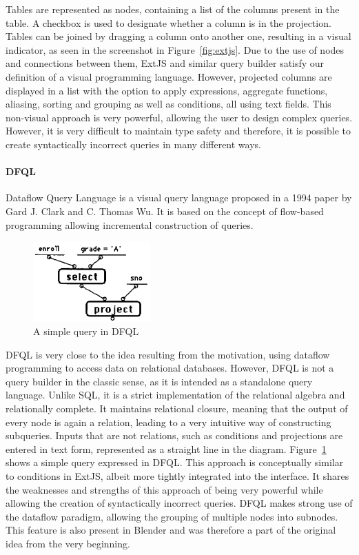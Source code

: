 \documentclass[11pt,a4paper]{globis-book}
\begin{document}
Tables are represented as nodes, containing a list of the columns present in the table. A checkbox is used to designate whether a column is in the projection. Tables can be joined by dragging a column onto another one, resulting in a visual indicator, as seen in the screenshot in Figure~\ref{fig:extjs}. Due to the use of nodes and connections between them, ExtJS and similar query builder satisfy our definition of a visual programming language. However, projected columns are displayed in a list with the option to apply expressions, aggregate functions, aliasing, sorting and grouping as well as conditions, all using text fields. This non-visual approach is very powerful, allowing the user to design complex queries. However, it is very difficult to maintain type safety and therefore, it is possible to create syntactically incorrect queries in many different ways.

\paragraph*{DFQL}
Dataflow Query Language is a visual query language proposed in a 1994 paper by Gard J. Clark and C. Thomas Wu\cite{clark1994dfql}. It is based on the concept of flow-based programming allowing incremental construction of queries.

\begin{figure}[h]
  \centering
  \includegraphics[width=0.4\textwidth]{resources/DFQL.png}
  \caption{A simple query in DFQL}
  \label{fig:dfql}
\end{figure}

DFQL is very close to the idea resulting from the motivation, using dataflow programming to access data on relational databases. However, DFQL is not a query builder in the classic sense, as it is intended as a standalone query language. Unlike SQL, it is a strict implementation of the relational algebra and relationally complete. It maintains relational closure, meaning that the output of every node is again a relation, leading to a very intuitive way of constructing subqueries. Inputs that are not relations, such as conditions and projections are entered in text form, represented as a straight line in the diagram. Figure~\ref{fig:dfql} shows a simple query expressed in DFQL. This approach is conceptually similar to conditions in ExtJS, albeit more tightly integrated into the interface. It shares the weaknesses and strengths of this approach of being very powerful while allowing the creation of syntactically incorrect queries. DFQL makes strong use of the dataflow paradigm, allowing the grouping of multiple nodes into subnodes. This feature is also present in Blender and was therefore a part of the original idea from the very beginning.
\end{document}
